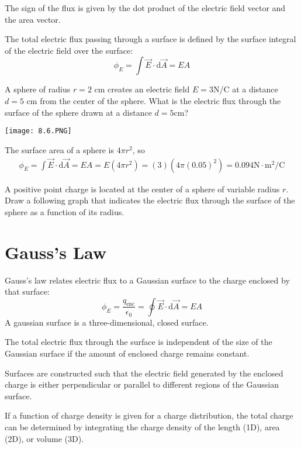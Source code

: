 \documentclass[../em.tex]{subfiles}
\begin{document}
The sign of the flux is given by the dot product of the electric field vector and the area vector.

The total electric flux passing through a surface is defined by the surface integral of the electric field over the surface:
\[\phi_E=\int\vec{E}\cdot\mathrm{d}\vec{A}=EA\]
\begin{example}
    A sphere of radius $r=2$ cm creates an electric field $E=3$N/C at a distance $d=5$ cm from the 
    center of the sphere. What is the electric flux through the surface of the sphere drawn at a distance $d=5$cm?
    \begin{center}
        \texttt{[image: 8.6.PNG]}
    \end{center}
    The surface area of a sphere is $4\pi r^2$, so
    \begin{align*}
        \phi_E=\int\vec{E}\cdot\mathrm{d}\vec{A}=EA=E(4\pi r^2)=(3)(4\pi(0.05)^2)=0.094\text{N}\cdot\text{m}^2\text{/C}
    \end{align*} 
\end{example}

\ex A positive point charge is located at the center of a sphere of variable radius $r$. Draw a following graph that indicates the electric flux through the surface of the sphere as a function of its radius.

\section{Gauss's Law}
Gauss's law relates electric flux to a Gaussian surface to the charge enclosed by that surface:
\[\phi_E=\frac{q_{\text{enc}}}{\epsilon_0}=\oint\vec{E}\cdot\mathrm{d}\vec{A}=EA\]
A gaussian surface is a three-dimensional, closed surface. 

The total electric flux through the surface is independent of the size of the Gaussian 
surface if the amount of enclosed charge remains constant.

Surfaces are constructed such that the electric field generated by the enclosed 
charge is either perpendicular or parallel to different regions of the Gaussian surface.

If a function of charge density is given for a charge distribution, the total 
charge can be determined by integrating the charge density of the length (1D), area (2D), or volume (3D).
\end{document}
